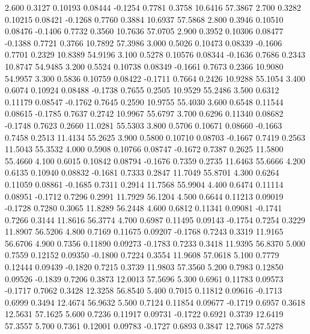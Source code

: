    2.600   0.3127   0.10193   0.08444  -0.1254   0.7781   0.3758  10.6416  57.3867
   2.700   0.3282   0.10215   0.08421  -0.1268   0.7760   0.3884  10.6937  57.5868
   2.800   0.3946   0.10510   0.08476  -0.1406   0.7732   0.3560  10.7636  57.0705
   2.900   0.3952   0.10306   0.08477  -0.1388   0.7721   0.3766  10.7892  57.3986
   3.000   0.5026   0.10473   0.08339  -0.1606   0.7701   0.2329  10.8389  54.9196
   3.100   0.5278   0.10576   0.08344  -0.1636   0.7686   0.2343  10.8747  54.9485
   3.200   0.5524   0.10738   0.08349  -0.1661   0.7673   0.2366  10.9080  54.9957
   3.300   0.5836   0.10759   0.08422  -0.1711   0.7664   0.2426  10.9288  55.1054
   3.400   0.6074   0.10924   0.08488  -0.1738   0.7655   0.2505  10.9529  55.2486
   3.500   0.6312   0.11179   0.08547  -0.1762   0.7645   0.2590  10.9755  55.4030
   3.600   0.6548   0.11544   0.08615  -0.1785   0.7637   0.2742  10.9967  55.6797
   3.700   0.6296   0.11340   0.08682  -0.1748   0.7623   0.2660  11.0281  55.5303
   3.800   0.5706   0.10671   0.08660  -0.1663   0.7458   0.2513  11.4134  55.2625
   3.900   0.5800   0.10710   0.08703  -0.1667   0.7419   0.2563  11.5043  55.3532
   4.000   0.5908   0.10766   0.08747  -0.1672   0.7387   0.2625  11.5800  55.4660
   4.100   0.6015   0.10842   0.08794  -0.1676   0.7359   0.2735  11.6463  55.6666
   4.200   0.6135   0.10940   0.08832  -0.1681   0.7333   0.2847  11.7049  55.8701
   4.300   0.6264   0.11059   0.08861  -0.1685   0.7311   0.2914  11.7568  55.9904
   4.400   0.6474   0.11114   0.08951  -0.1712   0.7296   0.2991  11.7929  56.1204
   4.500   0.6644   0.11213   0.09019  -0.1728   0.7280   0.3065  11.8289  56.2448
   4.600   0.6812   0.11341   0.09081  -0.1741   0.7266   0.3144  11.8616  56.3774
   4.700   0.6987   0.11495   0.09143  -0.1754   0.7254   0.3229  11.8907  56.5206
   4.800   0.7169   0.11675   0.09207  -0.1768   0.7243   0.3319  11.9165  56.6706
   4.900   0.7356   0.11890   0.09273  -0.1783   0.7233   0.3418  11.9395  56.8370
   5.000   0.7559   0.12152   0.09350  -0.1800   0.7224   0.3554  11.9608  57.0618
   5.100   0.7779   0.12444   0.09439  -0.1820   0.7215   0.3739  11.9803  57.3560
   5.200   0.7983   0.12850   0.09526  -0.1839   0.7206   0.3873  12.0013  57.5696
   5.300   0.6961   0.11783   0.09573  -0.1717   0.7062   0.3428  12.3258  56.8540
   5.400   0.7015   0.11812   0.09616  -0.1713   0.6999   0.3494  12.4674  56.9632
   5.500   0.7124   0.11854   0.09677  -0.1719   0.6957   0.3618  12.5631  57.1625
   5.600   0.7236   0.11917   0.09731  -0.1722   0.6921   0.3739  12.6419  57.3557
   5.700   0.7361   0.12001   0.09783  -0.1727   0.6893   0.3847  12.7068  57.5278
